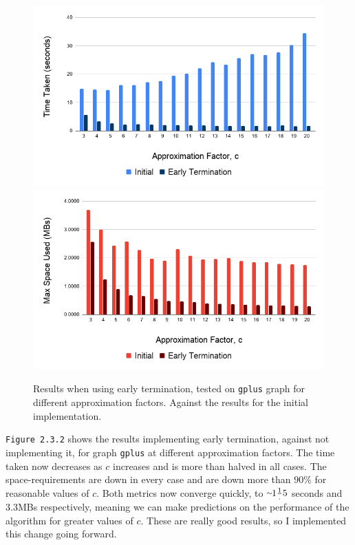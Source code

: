 \documentclass[11pt,twoside,a4paper]{report}
\begin{document}
\begin{figure}[H]
	\label{Figure 3}
	\includegraphics[width=.5\textwidth]{img/gplusEarlyTerminationTime.png}
	\includegraphics[width=.5\textwidth]{img/gplusEarlyTerminationSpace.png}
	\caption{Results when using early termination, tested on \texttt{gplus} graph for different approximation factors. Against the results for the initial implementation.}
\end{figure}

\par \texttt{Figure 2.3.2} shows the results implementing early termination, against not implementing it, for graph \texttt{gplus} at different approximation factors. The time taken now decreases as $c$ increases and is more than halved in all cases. The space-requirements are down in every case and are down more than $90\%$ for reasonable values of $c$. Both metrics now converge quickly, to $\smallsim\!\!1\frac1.5$ seconds and $3.3$MBs respectively, meaning we can make predictions on the performance of the algorithm for greater values of $c$. These are really good results, so I implemented this change going forward. %
\end{document}
